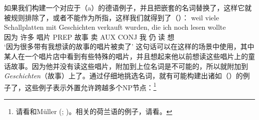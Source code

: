 如果我们构建一个对应于（a）的德语例子，并且把嵌套的名词替换了，这样它就被规则排除了，或者不能作为所指，这样我们就得到了（）：
\ea
\gll weil viele Schallplatten mit Geschichten verkauft wurden, die ich noch lesen wollte\\
	 因为 许多 唱片 PREP 故事 卖 AUX CONJ 我 仍 读 想\\
\glt `因为很多带有我想读的故事的唱片被卖了'
\z
这句话可以在这样的场景中使用，其中某人在一个唱片店中看到有些特殊的唱片，并且想起来他以前想读这些唱片上的童话故事。因为他并没有读这些唱片，附加到上位名词是不可能的，所以就附加到\emph{Geschichten}（故事）上了。通过仔细地挑选名词，就有可能构建出诸如（）的例子了，这些例子表示外置允许跨越多个NP节点：\footnote{
请看和Müller (\citeyear{Mueller2004d};
  \citeyear[Section~3]{Mueller2007c})。相关的荷兰语的例子，请看。
}

